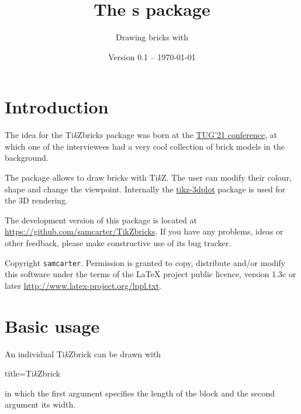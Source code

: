 \documentclass[parskip=half]{scrartcl}
\title{The \tikzbrick{}s package}
\subtitle{Drawing bricks with \TikZ}
\author{%
	\texorpdfstring{
		\begin{tikzpicture}
			 \brick[color=blue]{4}{2}
		\end{tikzpicture}\\[0.8em]		
		\texttt{samcarter}\\
		\url{https://github.com/samcarter/TikZbricks}\\
		\url{https://www.ctan.org/pkg/tikzbricks}
	}{samcarter}}
\date{Version 0.1 -- \today}
\newcommand{\CTAN}{\textsc{CTAN}\xspace}
\newcommand{\TikZ}{Ti\emph{k}Z\xspace}
\newcommand{\miktex}{MiK\TeX\xspace}
\newcommand{\texlive}{\TeX{}Live\xspace}
\newcommand{\tikzbrick}{Ti\emph{k}Zbrick\xspace}
\begin{document}
\maketitle
\thispagestyle{scrheadings}

\section{Introduction}
\label{intro}

The idea for the \tikzbrick{}s package was born at the \href{https://tug.org/tug2021/}{TUG'21 conference}, at which one of the interviewees had a very cool collection of brick models in the background. %

The package allows to draw bricks with \TikZ. The user can modify their colour, shape and change the viewpoint. Internally the \href{https://ctan.org/pkg/tikz-3dplot}{tikz-3dplot} package is used for the 3D rendering. 

The development version of this package is located at \url{https://github.com/samcarter/TikZbricks}. If you have any problems, ideas or other feedback, please make constructive use of its bug tracker.

Copyright  \texttt{samcarter}. Permission is granted to copy, distribute and\slash or modify this software under the terms of the LaTeX project public licence, version 1.3c or later \url{http://www.latex-project.org/lppl.txt}.

\section{Basic usage}

An individual \tikzbrick can be drawn with
\begin{tcblisting}{title={\tikzbrick}}
\end{tcblisting}
in which the first argument specifies the length of the block and the second argument its width. 
\end{document}
